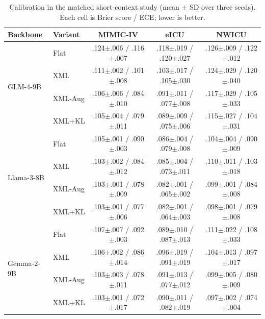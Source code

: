 \begin{table}[t]
\caption{Calibration in the matched short-context study (mean $\pm$ SD over three seeds). Each cell is Brier score / ECE; lower is better.}
\label{tab:multicenter_calibration}
\centering
\scriptsize
\setlength{\tabcolsep}{4.2pt}
\begin{tabular}{llccc}
\toprule
Backbone & Variant & MIMIC-IV & eICU & NWICU \\
\midrule
\multirow{4}{*}{GLM-4-9B}
& Flat    & .124$\pm$.006 / .116$\pm$.007 & .118$\pm$.019 / .120$\pm$.027 & .126$\pm$.009 / .122$\pm$.012 \\
& XML     & .111$\pm$.002 / .101$\pm$.008 & .103$\pm$.017 / .105$\pm$.030 & .124$\pm$.029 / .120$\pm$.040 \\
& XML-Aug & .106$\pm$.006 / .084$\pm$.010 & .091$\pm$.011 / .077$\pm$.008 & .117$\pm$.029 / .105$\pm$.033 \\
& XML+KL  & .105$\pm$.004 / .079$\pm$.011 & .089$\pm$.009 / .075$\pm$.006 & .115$\pm$.027 / .104$\pm$.031 \\
\midrule
\multirow{4}{*}{Llama-3-8B}
& Flat    & .105$\pm$.001 / .090$\pm$.003 & .086$\pm$.004 / .079$\pm$.008 & .104$\pm$.004 / .090$\pm$.009 \\
& XML     & .103$\pm$.002 / .084$\pm$.012 & .085$\pm$.004 / .073$\pm$.011 & .110$\pm$.011 / .103$\pm$.018 \\
& XML-Aug & .103$\pm$.001 / .078$\pm$.009 & .082$\pm$.001 / .065$\pm$.002 & .099$\pm$.001 / .084$\pm$.008 \\
& XML+KL  & .103$\pm$.001 / .077$\pm$.006 & .082$\pm$.001 / .064$\pm$.003 & .098$\pm$.001 / .079$\pm$.008 \\
\midrule
\multirow{4}{*}{Gemma-2-9B}
& Flat    & .107$\pm$.007 / .092$\pm$.003 & .089$\pm$.010 / .087$\pm$.013 & .111$\pm$.022 / .108$\pm$.033 \\
& XML     & .106$\pm$.002 / .086$\pm$.014 & .096$\pm$.019 / .091$\pm$.019 & .104$\pm$.013 / .097$\pm$.017 \\
& XML-Aug & .103$\pm$.003 / .078$\pm$.011 & .091$\pm$.013 / .077$\pm$.012 & .099$\pm$.005 / .080$\pm$.009 \\
& XML+KL  & .103$\pm$.001 / .072$\pm$.017 & .090$\pm$.011 / .082$\pm$.019 & .097$\pm$.002 / .074$\pm$.004 \\
\bottomrule
\end{tabular}
\end{table}
